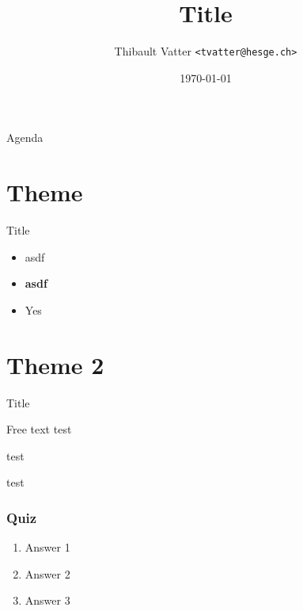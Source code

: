\documentclass[11pt]{beamer}
\title{Title}
\institute{University of Applied Sciences Western Switzerland}
\date{\today}
\author[T.~Vatter]{Thibault Vatter \texttt{<tvatter@hesge.ch>}}
\begin{document}

{ %
\begin{frame}[noframenumbering] 
	\titlepage
\end{frame}
}


\begin{frame}{Agenda}
	\tableofcontents
\end{frame}


\section{Theme}


\begin{frame}{Title}

	\begin{itemize}
		\item asdf  
		\item  \textbf{asdf}  
		\item[\cmark] Yes
	\end{itemize}
\end{frame}


\section{Theme 2}

\begin{frame}{Title}



	\begin{block}{Free text}
		test
	\end{block}

  \begin{example}[asdf]
		test
	\end{example}

	\begin{theorem}[asdf]
		test
	\end{theorem}

\end{frame}


\begin{frame}
	\frametitle{Quiz}

	\begin{enumerate}
		\item Answer 1
		\item Answer 2
		\item Answer 3 \onslide<2->{\cmark}
	\end{enumerate}

\end{frame}
\end{document}
